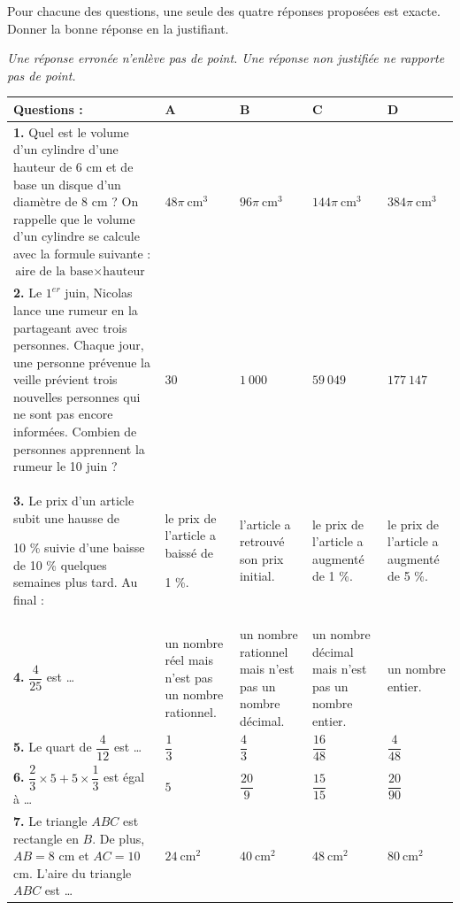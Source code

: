 Pour chacune des questions, une seule des quatre réponses proposées est exacte. Donner la
bonne réponse en la justifiant.

\textit{Une réponse erronée n’enlève pas de point. Une réponse non justifiée ne rapporte pas de
point.}

\begin{center}

	\renewcommand{\arraystretch}{3}
	\noindent\begin{tabularx}{0.9\linewidth}{|>{\hsize=7cm}X|*{4}{>{\centering \arraybackslash}X|}}
	\hline 
	\textbf{Questions :} & \textbf{A} & \textbf{B} & \textbf{C} & \textbf{D} \\ 
	\hline 		
		\textbf{1.} Quel est le volume d'un cylindre
		d'une hauteur de 6 cm et de base un
		disque d’un diamètre de 8 cm ?
		On rappelle que le volume d'un
		cylindre se calcule avec la formule
		suivante : $\text{aire de la base} \times \text{hauteur}$
		& $48\pi~\text{cm}^3$ & $96\pi~\text{cm}^3$ & $144\pi~\text{cm}^3$ & $384\pi~\text{cm}^3$ \\ 
	\hline 	
	\textbf{2.} Le $1^{er}$ juin, Nicolas lance une rumeur
	en la partageant avec trois	personnes. Chaque jour, une
	personne prévenue la veille prévient trois nouvelles personnes qui ne sont
	pas encore informées. Combien de personnes apprennent la rumeur le 10 juin ?	
	& $30$ & $1~000$ & $59~049$ & $177~147$ \\ 
	\hline 	
	\textbf{3.}	Le prix d’un article subit une hausse
	de \par 10 \% suivie d’une baisse de 10 \%
	quelques semaines plus tard. Au
	final :	
 	&
	le prix de	l’article a	baissé de \par 1 \%.
	&
	l'article a retrouvé son prix initial.
	&
	le prix de l'article a augmenté de 1 \%.
	&
	le prix de l'article a augmenté de 5 \%.
	\\ 
	\hline 	
	\textbf{4.}	$\dfrac{4}{25}$ est \ldots
	&
	un nombre réel mais n'est pas un nombre rationnel.
	&
	un nombre rationnel mais n'est pas un nombre décimal.
	&
	un nombre décimal mais n'est pas un nombre entier.
	&
	un nombre entier.
	\\ 
	\hline 
	\textbf{5.} Le quart de $\dfrac{4}{12}$ est \ldots	
	& $\dfrac{1}{3}$ & $\dfrac{4}{3}$ & $\dfrac{16}{48}$ & $\dfrac{4}{48}$ \\ 
	\hline 	
	\textbf{6.} $\dfrac{2}{3}\times 5 + 5 \times \dfrac{1}{3}$ est égal à	\ldots
	& $5$ & $\dfrac{20}{9}$ & $\dfrac{15}{15}$ & $\dfrac{20}{90}$ \\ 
	\hline 	
	\textbf{7.} Le triangle $ABC$ est rectangle en $B$.	
	De plus, $AB = 8$ cm et $AC = 10$ cm.
	L’aire du triangle $ABC$ est \ldots	
	& $24~\text{cm}^2$ & $40~\text{cm}^2$ & $48~\text{cm}^2$ & $80~\text{cm}^2$ \\ 
	\hline 
	\end{tabularx}	
	\renewcommand{\arraystretch}{1} 	
\end{center}